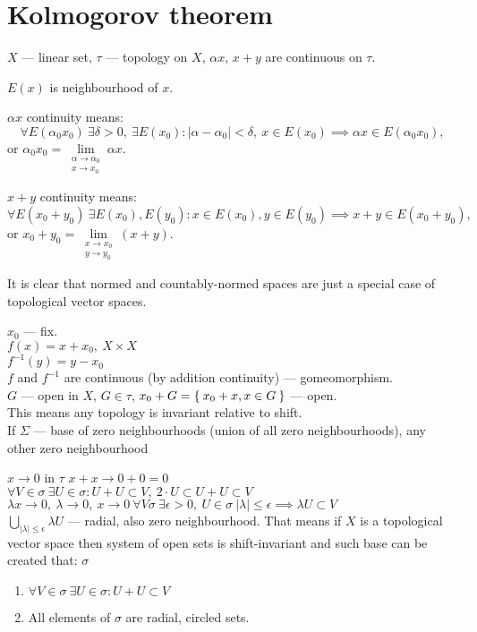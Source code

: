 \section{Kolmogorov theorem}
\begin{defn}
  $X$ --- linear set, $\tau$ --- topology on $X$, $\alpha x$, $x + y$ are
  continuous on $\tau$.

  \noindent $E(x)$ is neighbourhood of $x$.
  
  \noindent $\alpha x$ continuity means:
  \[
    \forall E(\alpha_0 x_0)\ \exists \delta > 0,\ \exists E(x_0) \colon
    |\alpha - \alpha_0| < \delta,\ x \in E(x_0) \implies
    \alpha x \in E(\alpha_0 x_0),
  \]
  or $\alpha_0 x_0 = \lim\limits_{\substack{\alpha \to \alpha _0\\ x \to x_0}} \alpha x$.

  \noindent $x + y$ continuity means:
  \[
    \forall E(x_0 + y_0)\ \exists E(x_0), E(y_0) \colon
    x \in E(x_0), y \in E(y_0) \implies x + y \in E(x_0 + y_0),
  \]
  or $x_0 + y_0 = \lim\limits_{\substack{x \to x_0\\ y \to y_0}}(x + y)$.
\end{defn}

It is clear that normed and countably-normed spaces are just a special case of
topological vector spaces.

\noindent
$x_0$ --- fix. \\
$f(x) = x + x_0,\ X \times X $ \\
$f^{-1}(y) = y - x_0$ \\
$f$ and $f^{-1}$ are continuous (by addition continuity) --- gomeomorphism. \\
$G$ --- open in $X$, $G \in \tau$, $x_0 + G = \Set{x_0 + x, x \in G}$ --- open. \\
This means any topology is invariant relative to shift. \\
If $\Sigma$ --- base of zero neighbourhoods (union of all zero neighbourhoods), any
other zero neighbourhood 

$x \to 0$ in $\tau$ $x + x \to 0 + 0 = 0$\\
$\forall V \in \sigma\ \exists U \in \sigma \colon U + U \subset V,\ 2 \cdot U
\subset U + U \subset V$ \\
$\lambda x \to 0,\ \lambda \to 0,\ x \to 0\ \forall V \sigma\ \exists \epsilon >
0,\ U \in \sigma\ |\lambda| \leq \epsilon \implies \lambda U \subset V$ \\
$\bigcup\limits_{|\lambda| \leq \epsilon} \lambda U$ --- radial, also zero
neighbourhood. That means if $X$ is a topological vector space then system of open
sets is shift-invariant and such base can be created that:
$\sigma$ 
\begin{enumerate}
\item $\forall V \in \sigma\ \exists U \in \sigma: U + U \subset V$
\item All elements of $\sigma$ are radial, circled sets.
\end{enumerate}

